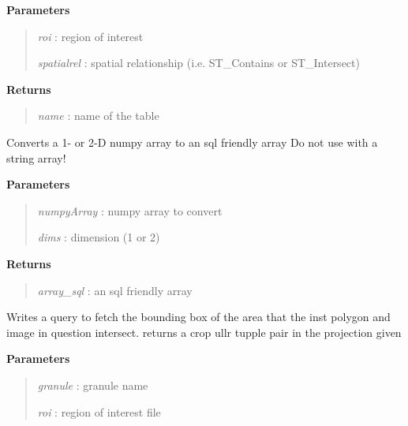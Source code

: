 \documentclass[letterpaper,10pt,english]{sphinxmanual}
\begin{document}
\begin{fulllineitems}
\begin{fulllineitems}
\textbf{Parameters}
\begin{quote}

\emph{roi}        : region of interest

\emph{spatialrel} : spatial relationship (i.e. ST\_Contains or ST\_Intersect)
\end{quote}

\textbf{Returns}
\begin{quote}

\emph{name}       : name of the table
\end{quote}

\end{fulllineitems}


\begin{fulllineitems}
\label{code:Database.Database.numpy2sql}
Converts a 1- or 2-D numpy array to an sql friendly array
Do not use with a string array!

\textbf{Parameters}
\begin{quote}

\emph{numpyArray} : numpy array to convert

\emph{dims}       : dimension (1 or 2)
\end{quote}

\textbf{Returns}
\begin{quote}

\emph{array\_sql}  : an sql friendly array
\end{quote}

\end{fulllineitems}


\begin{fulllineitems}
\label{code:Database.Database.qryCropZone}
Writes a query to fetch the bounding box of the area that the inst polygon and
image in question intersect.
returns a crop ullr tupple pair in the projection given

\textbf{Parameters}
\begin{quote}

\emph{granule}    : granule name

\emph{roi}        : region of interest file


\end{quote}
\end{fulllineitems}
\end{fulllineitems}
\end{document}
